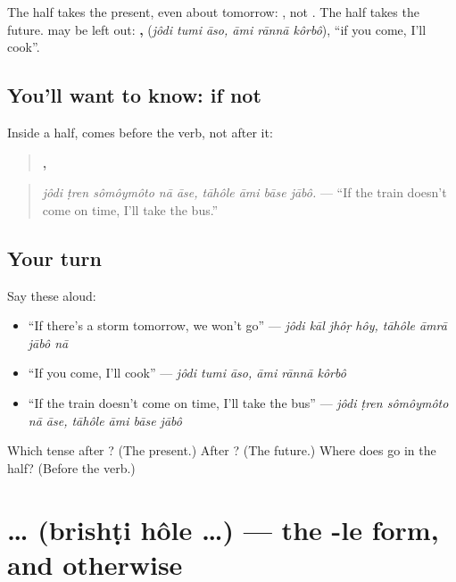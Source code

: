 The \textbf{} half takes the present, even about tomorrow: \textbf{}, not \textbf{}. The \textbf{} half takes the future. \textbf{} may be left out: \textbf{  ,   } (\emph{jôdi tumi āso, āmi rānnā kôrbô}), \textquotedblleft{}if you come, I'll cook\textquotedblright{}.

\subsection*{You'll want to know: if not}
Inside a \textbf{} half, \textbf{} comes before the verb, not after it:

\begin{quote}
\textbf{    ,    }
\end{quote}

\begin{quote}
\emph{jôdi ṭren sômôymôto nā āse, tāhôle āmi bāse jābô.} — \textquotedblleft{}If the train doesn't come on time, I'll take the bus.\textquotedblright{}
\end{quote}

\subsection*{Your turn}
Say these aloud:

\begin{itemize}
\raggedright
  \item \textquotedblleft{}If there's a storm tomorrow, we won't go\textquotedblright{} — \emph{jôdi kāl jhôṛ hôy, tāhôle āmrā jābô nā}
  \item \textquotedblleft{}If you come, I'll cook\textquotedblright{} — \emph{jôdi tumi āso, āmi rānnā kôrbô}
  \item \textquotedblleft{}If the train doesn't come on time, I'll take the bus\textquotedblright{} — \emph{jôdi ṭren sômôymôto nā āse, tāhôle āmi bāse jābô}
\end{itemize}

\begin{tcolorbox}[breakable,colback=teal!4,colframe=teal!35!black,title={Before you move on}]
Which tense after \textbf{}? (The present.) After \textbf{}? (The future.) Where does \textbf{} go in the \textbf{} half? (Before the verb.)
\end{tcolorbox}
\section[\texorpdfstring{\bn{বৃষ্টি} \bn{হলে} … (brishṭi hôle …)}{বৃষ্টি হলে … (brishṭi hôle …)}]{  … (brishṭi hôle …) — the -le form, and otherwise}

